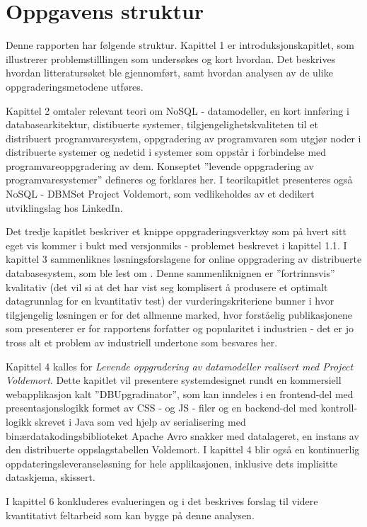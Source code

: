 \section{Oppgavens struktur}

Denne rapporten har følgende struktur. Kapittel 1 er introduksjonskapitlet, som illustrerer problemstilllingen som undersøkes og kort hvordan. Det beskrives hvordan litteratursøket ble gjennomført, samt hvordan analysen av de ulike oppgraderingsmetodene utføres.

Kapittel 2 omtaler relevant teori om NoSQL - datamodeller, en kort innføring i databasearkitektur, distibuerte systemer, tilgjengelighetskvaliteten til et distribuert programvaresystem, oppgradering av programvaren som utgjør noder i distribuerte systemer og nedetid i systemer som oppstår i forbindelse med programvareoppgradering av dem. Konseptet ''levende oppgradering av programvaresystemer'' defineres og forklares her. I teorikapitlet presenteres også NoSQL - DBMSet Project Voldemort, som vedlikeholdes av et dedikert utviklingslag hos LinkedIn.

Det tredje kapitlet beskriver et knippe oppgraderingsverktøy som på hvert sitt eget vis kommer i bukt med versjonmiks - problemet beskrevet i kapittel 1.1. I kapittel 3 sammenliknes løsningsforslagene for online oppgradering av distribuerte databasesystem, som ble lest om . Denne sammenliknignen er ''fortrinnsvis'' kvalitativ (det vil si at det har vist seg komplisert å produsere et optimalt datagrunnlag for en kvantitativ test) der vurderingskriteriene bunner i hvor tilgjengelig løsningen er for det allmenne marked, hvor forståelig publikasjonene som presenterer er for rapportens forfatter og popularitet i industrien - det er jo tross alt et problem av industriell undertone som besvares her.

Kapittel 4 kalles for \emph{Levende oppgradering av datamodeller realisert med Project Voldemort}. Dette kapitlet vil presentere systemdesignet rundt en kommersiell webapplikasjon kalt ''DBUpgradinator'', som kan inndeles i en frontend-del med presentasjonslogikk formet av CSS - og JS - filer og en backend-del med kontroll-logikk skrevet i Java som ved hjelp av serialisering med binærdatakodingsbiblioteket Apache Avro snakker med datalageret, en instans av den distribuerte oppslagstabellen Voldemort. I kapittel 4 blir også en kontinuerlig oppdateringsleveranseløsning for hele applikasjonen, inklusive dets implisitte dataskjema, skissert.

I kapittel 6 konkluderes evalueringen og i det beskrives forslag til videre kvantitativt feltarbeid som kan bygge på denne analysen.
